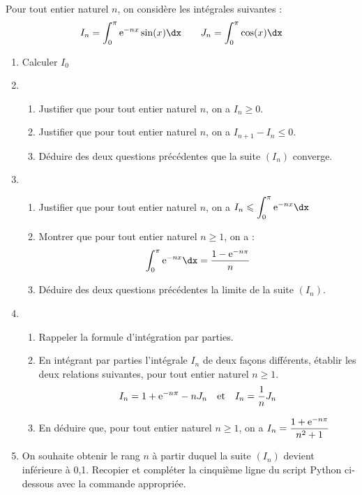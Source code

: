 \documentclass[11pt,fleqn, openany]{book} %
\begin{document}
\begin{exercise}[topic=trig02, subtitle={(Amérique du Nord 2024)}]

Pour tout entier naturel $n$, on considère les intégrales suivantes :
\[I_n = \displaystyle\int_0^{\pi}\e^{-nx}\sin(x)\dx \qquad J_n=\displaystyle\int_0^{\pi}\cos(x)\dx\]

\begin{enumerate}
\item Calculer $I_0$
\vskip10pt
\item \begin{enumerate}
\item Justifier que pour tout entier naturel $n$, on a $I_n \geqslant 0$.
\item Justifier que pour tout entier naturel $n$, on a $I_{n+1}-I_n \leqslant 0$.
\item Déduire des deux questions précédentes que la suite $(I_n)$ converge.\end{enumerate}
\vskip10pt
\item \begin{enumerate} \item Justifier que pour tout entier naturel $n$, on a $I_n \leqslant \displaystyle\int_0^{\pi} \e^{-nx}\dx$
\item Montrer que pour tout entier naturel $n\geqslant 1$, on a :
\[\displaystyle\int_0^{\pi}\e^{-nx}\dx=\dfrac{1-\e^{-n\pi}}{n}\]
\item Déduire des deux questions précédentes la limite de la suite $(I_n)$. \end{enumerate}
\vskip10pt
\item \begin{enumerate} \item Rappeler la formule d'intégration par parties.
\item En intégrant par parties l'intégrale $I_n$ de deux façons différents, établir les deux relations suivantes, pour tout entier naturel $n\geqslant 1$.
\[I_n=1+\mathrm{e}^{-n\pi}-nJ_n \quad\text{et}\quad I_n=\dfrac{1}{n}J_n\]
\item En déduire que, pour tout entier naturel $n\geqslant 1$, on a $I_n=\dfrac{1+\mathrm{e}^{-n\pi}}{n^2+1}$\end{enumerate}
\item On souhaite obtenir le rang $n$ à partir duquel la suite $(I_n)$ devient inférieure à 0,1. Recopier et compléter la cinquième ligne du script Python ci-dessous avec la commande appropriée.

\end{enumerate}
\newpage
\end{exercise}
\end{document}
